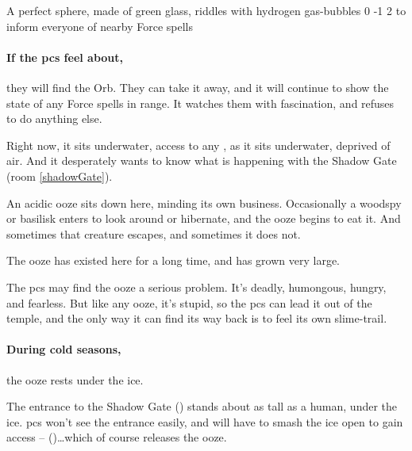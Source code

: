 \setcounter{wounds}{9}

  {A perfect sphere, made of green glass, riddles with hydrogen gas-bubbles}%
  {0}%
  {-1}%
  {2}%
  {to inform everyone of nearby Force spells}%
  {
    \setcounter{Air}{3}
    \setcounter{Fire}{3}
    \setcounter{Earth}{1}
    \setcounter{Academics}{2}
    \setcounter{Xenomology}{2}
  }%

\setcounter{wounds}{0}

\showStdSpells[
  \setcounter{enc}{2}
  \findGatewaySpell
]

\paragraph{If the \glspl{pc} feel about,}
they will find the Orb.
They can take it away, and it will continue to show the state of any Force spells in range.
It watches them with fascination, and refuses to do anything else.

Right now, it sits underwater, access to any , as it sits underwater, deprived of air.
And it desperately wants to know what is happening with the Shadow Gate (room \vref{shadowGate}).


An acidic ooze sits down here, minding its own business.
Occasionally a woodspy or basilisk enters to look around or hibernate, and the ooze begins to eat it.
And sometimes that creature escapes, and sometimes it does not.

The ooze has existed here for a long time, and has grown very large.


The \glspl{pc} may find the ooze a serious problem.
It's deadly, humongous, hungry, and fearless.
But like any ooze, it's stupid, so the \glspl{pc} can lead it out of the temple, and the only way it can find its way back is to feel its own slime-trail.

\paragraph{During cold seasons,}
the ooze rests under the ice.

The entrance to the Shadow Gate () stands about as tall as a human, under the ice.
\Glspl{pc} won't see the entrance easily, and will have to smash the ice open to gain access --  (\tn[10])\ldots which of course releases the ooze.


